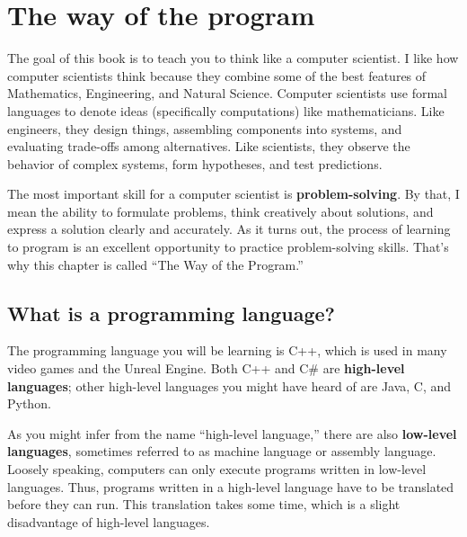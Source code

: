 

\chapter{The way of the program}

The goal of this book is to teach you to think like a
computer scientist.  I like how computer scientists think because
they combine some of the best features of Mathematics, Engineering,
and Natural Science.  Computer scientists use formal
languages to denote ideas (specifically computations) like mathematicians.  Like
engineers, they design things, assembling components into systems, and
evaluating trade-offs among alternatives.  Like scientists,
they observe the behavior of complex systems, form hypotheses, and test
predictions.

The most important skill for a computer scientist is {\bf
problem-solving}.  By that, I mean the ability to formulate problems,
think creatively about solutions, and express a solution clearly and
accurately.  As it turns out, the process of learning to program is an
excellent opportunity to practice problem-solving skills.  That's why
this chapter is called ``The Way of the Program.''

\section{What is a programming language?}

The programming language you will be learning is C++, which is used in many video games and the Unreal Engine. Both C++ and C\# are
 {\bf high-level languages}; other high-level languages you might have 
heard of are Java, C, and Python.

As you might infer from the name ``high-level language,'' there are
also {\bf low-level languages}, sometimes referred to as machine
language or assembly language.  Loosely speaking, computers can only
execute programs written in low-level languages.  Thus, programs
written in a high-level language have to be translated before they can
run.  This translation takes some time, which is a slight disadvantage
of high-level languages.


